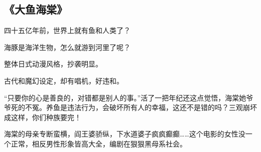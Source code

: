 \subsection{《大鱼海棠》}
四十五亿年前，世界上就有鱼和人类了？

海豚是海洋生物，怎么就游到河里了呢？

整体日式动漫风格，抄袭明显。

古代和魔幻设定，却有唱机，好违和。

“只要你的心是善良的，对错都是别人的事。”活了一把年纪还这点觉悟，海棠她爷爷死的不冤。养鱼是违法行为，会破坏所有人的幸福，这还不是错的吗？三观崩坏成这样，你们种族要完！

海棠的母亲专断蛮横，阎王婆骄纵，下水道婆子疯疯癫癫……这个电影的女性没一个正常，相反男性形象皆高大全，编剧在狠狠黑母系社会。